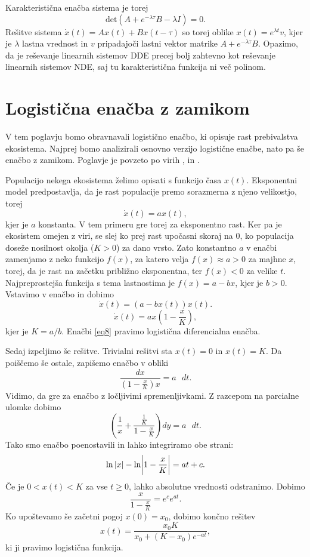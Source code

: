 \documentclass[12pt,a4paper]{amsart}
\theoremstyle{definition} %
\theoremstyle{plain} %
\begin{document}
Karakteristična enačba sistema je torej
\[\text{det}(A+e^{-\lambda\tau}B-\lambda I)=0.\]
Rešitve sistema $\dot{x}(t)=Ax(t)+Bx(t-\tau)$ so torej oblike $x(t)=e^{\lambda t}v$, kjer je $\lambda$ lastna vrednost in $v$ pripadajoči lastni 
vektor matrike $A+e^{-\lambda\tau}B$. Opazimo, da je reševanje linearnih sistemov DDE precej bolj zahtevno kot
reševanje linearnih sistemov NDE, saj tu karakteristična funkcija ni več polinom.

\section{Logistična enačba z zamikom}
V tem poglavju bomo obravnavali logistično enačbo, ki opisuje rast prebivalstva ekosistema. Najprej bomo analizirali 
osnovno verzijo logistične enačbe, nato pa še enačbo z zamikom. Poglavje je povzeto po virih \cite{angdiploma}, 
\cite{logist} in \cite{slologist}.

Populacijo nekega ekosistema želimo opisati s funkcijo časa $x(t)$. Eksponentni model predpostavlja, da je rast 
populacije premo sorazmerna z njeno velikostjo, torej
\[\dot{x}(t)=ax(t), \]
kjer je $a$ konstanta. V tem primeru gre torej za eksponentno rast. Ker pa je ekosistem omejen z viri, se slej ko 
prej rast upočasni skoraj na 0, ko populacija doseže nosilnost okolja ($K>0$) za dano vrsto. Zato konstantno $a$ v 
enačbi zamenjamo z neko funkcijo $f(x)$, za katero velja $f(x)\approx a>0$ za majhne $x$, torej, da je rast na začetku 
približno eksponentna, ter $f(x)<0$ za velike $t$. Najpreprostejša funkcija s tema lastnostima je $f(x)=a-bx$, 
kjer je $b>0$. Vstavimo v enačbo in dobimo
\[\dot{x}(t)=(a-bx(t))x(t).\]
\begin{equation} \label{eq8}
    \dot{x}(t) = ax\left(1-\frac{x}{K}\right),
\end{equation}
kjer je $K=a/b$. Enačbi \eqref{eq8} pravimo logistična diferencialna enačba.

Sedaj izpeljimo še rešitve. Trivialni rešitvi sta $x(t)=0$ in $x(t)=K$. Da poiščemo še ostale, zapišemo enačbo v obliki
\[\frac{dx}{(1-\frac{x}{K})x}=a\text{ }dt.\]
Vidimo, da gre za enačbo z ločljivimi spremenljivkami. Z razcepom na parcialne ulomke dobimo
\[\left(\frac{1}{x}+\frac{\frac{1}{K}}{1-\frac{x}{K}}\right)dy=a\text{ }dt.\]
Tako smo enačbo poenostavili in lahko integriramo obe strani:
\[\ln|x|-\ln\biggr{|}1-\frac{x}{K}\biggr{|}=at+c.\]
Če je $0<x(t)<K$ za vse $t\geq0$, lahko absolutne vrednosti odstranimo. Dobimo 
\[\frac{x}{1-\frac{x}{K}}=e^ce^{at}.\]
Ko upoštevamo še začetni pogoj $x(0)=x_0$, dobimo končno rešitev
\[x(t)=\frac{x_0K}{x_0+(K-x_0)e^{-at}},\]
ki ji pravimo logistična funkcija.
\end{document}

